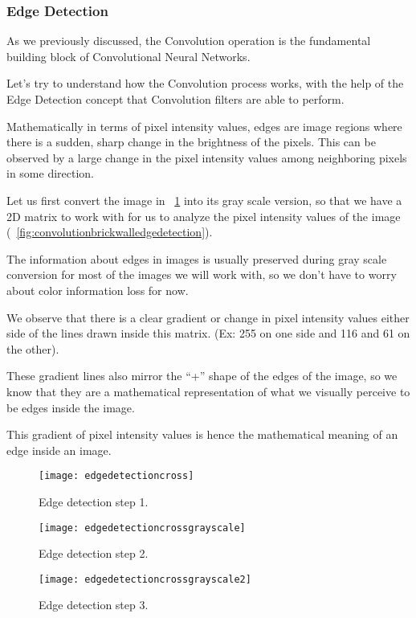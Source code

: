 	\subsubsection{Edge Detection}
	\begin{bulletedlist}
		\item As we previously discussed, the Convolution operation is the fundamental building block of Convolutional Neural Networks.

		\item Let's try to understand how the Convolution process works, with the help of the Edge Detection concept that Convolution filters are able to perform.
		\item Mathematically in terms of pixel intensity values, edges are image regions where there is a sudden, sharp change in the brightness of the pixels. This can be observed by a large change in the pixel intensity values among neighboring pixels in some direction.
		\item Let us first convert the image in \figurename~\ref{fig:edgedetectioncross} into its gray scale version, so that we have a 2D matrix to work with for us to analyze the pixel intensity values of the image (\figurename~\ref{fig:convolutionbrickwalledgedetection}).
		\item The information about edges in images is usually preserved during gray scale conversion for most of the images we will work with, so we don't have to worry about color information loss for now.
		\item We observe that there is a clear gradient or change in pixel intensity values either side of the lines drawn inside this matrix. (Ex: 255 on one side and 116 and 61 on the other).
		\item These gradient lines also mirror the ``+'' shape of the edges of the image, so we know that they are a mathematical representation of what we visually perceive to be edges inside the image.
		\item This gradient of pixel intensity values is hence the mathematical meaning of an edge inside an image.
		\begin{bulletedlist}
			\item
		\end{bulletedlist}
	\end{bulletedlist}

	\begin{figure}[h]
		\centering
		\texttt{[image: edgedetectioncross]}
		\caption[Edge detection step 1]{Edge detection step 1.}
		\label{fig:edgedetectioncross}
	\end{figure}
	\begin{figure}[h]
		\centering
		\texttt{[image: edgedetectioncrossgrayscale]}
		\caption[Edge detection step 2]{Edge detection step 2.}
		\label{fig:edgedetectioncrossgrayscale}
	\end{figure}
	\begin{figure}[h]
		\centering
		\texttt{[image: edgedetectioncrossgrayscale2]}
		\caption[Edge detection step 3]{Edge detection step 3.}
		\label{fig:edgedetectioncrossgrayscale2}
	\end{figure}

